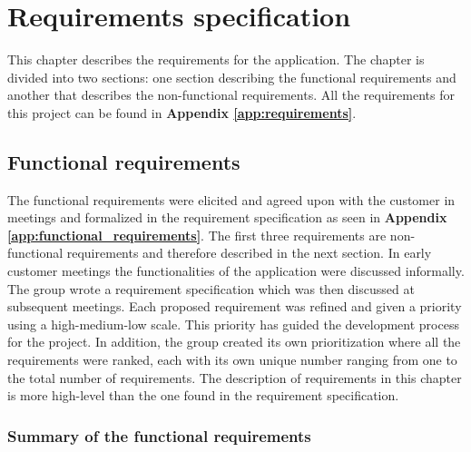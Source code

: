 
\chapter{Requirements specification}

This chapter describes the requirements for the application. The chapter is divided into two sections: one section describing the functional requirements and another that describes the non-functional requirements. All the requirements for this project can be found in \textbf{Appendix \ref{app:requirements}}.

\section{Functional requirements}

The functional requirements were elicited and agreed upon with the customer in meetings and formalized in the requirement specification as seen in \textbf{Appendix \ref{app:functional_requirements}}. The first three requirements are non-functional requirements and therefore described in the next section. In early customer meetings the functionalities of the application were discussed informally. The group wrote a requirement specification which was then discussed at subsequent meetings. Each proposed requirement was refined and given a priority using a high-medium-low scale. This priority has guided the development process for the project. In addition, the group created its own prioritization where all the requirements were ranked, each with its own unique number ranging from one to the total number of requirements. The description of requirements in this chapter is more high-level than the one found in the requirement specification. 

\subsection{Summary of the functional requirements}
\label{subsec:summary_functional_requirements}

